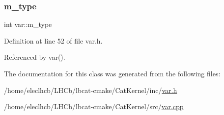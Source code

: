 \subsubsection{\texorpdfstring{m\+\_\+type}{m\_type}}
{\footnotesize\ttfamily int var\+::m\+\_\+type\hspace{0.3cm}{\ttfamily [private]}}



Definition at line 52 of file var.\+h.



Referenced by var().



The documentation for this class was generated from the following files\+:\begin{DoxyCompactItemize}
\item 
/home/eleclhcb/\+L\+H\+Cb/lbcat-\/cmake/\+Cat\+Kernel/inc/\hyperlink{var_8h}{var.\+h}\item 
/home/eleclhcb/\+L\+H\+Cb/lbcat-\/cmake/\+Cat\+Kernel/src/\hyperlink{var_8cpp}{var.\+cpp}\end{DoxyCompactItemize}
